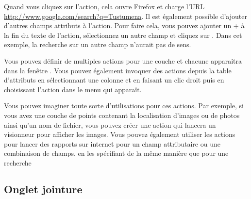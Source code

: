 Quand vous cliquez sur l'action, cela ouvre Firefox et charge l'URL \url{http://www.google.com/search?q=Tustumena}. Il est également possible d'ajouter d'autres champs attributs à l'action. Pour faire cela, vous pouvez ajouter un + à la fin du texte de l'action, sélectionnez un autre champ et cliquez sur . Dans cet exemple, la recherche sur un autre champ n'aurait pas de sens.

Vous pouvez définir de multiples actions pour une couche et chacune apparaitra dans la fenêtre . Vous pouvez également invoquer des actions depuis la table d'attributs en sélectionnant une colonne et en faisant un clic droit puis en choisissant l'action dans le menu qui apparaît.

Vous pouvez imaginer toute sorte d'utilisations pour ces actions. Par exemple, si vous avez une couche de points contenant la localisation d'images ou de photos ainsi qu'un nom de fichier, vous pouvez créer une action qui lancera un visionneur pour afficher les images. Vous pouvez également utiliser les actions pour lancer des rapports sur internet pour un champ attributaire ou une combinaison de champs, en les spécifiant de la même manière que pour une recherche

\subsection{Onglet jointure}\label{sec:joins}

